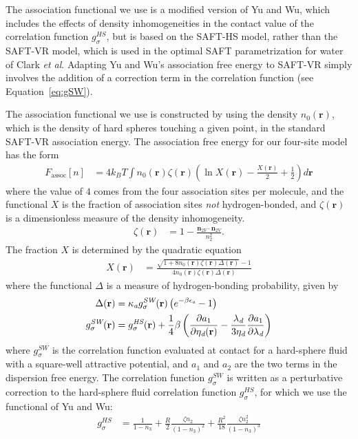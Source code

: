 \documentclass[letterpaper,twocolumn,amsmath,amssymb,prb]{revtex4-1}
\newcommand{\xx}{\textbf{r}}
\begin{document}
The association functional we use is a modified version of Yu
and Wu\cite{yu2002fmt-dft-inhomogeneous-associating}, which
includes the effects of density inhomogeneities in the contact value
of the correlation function $g^{HS}_\sigma$, but is based on the
SAFT-HS model, rather than the SAFT-VR
model\cite{gil-villegas-1997-SAFT-VR}, which is used in the optimal
SAFT parametrization for water of Clark \emph{et
  al}\cite{clark2006developing}.  Adapting Yu and Wu's association
free energy to SAFT-VR simply involves the addition of a correction
term in the correlation function (see Equation~\ref{eq:gSW}).

The association functional we use is constructed by using the density
$n_0(\xx)$, which is the density of hard spheres touching a given
point, in the standard SAFT-VR association
energy\cite{gil-villegas-1997-SAFT-VR}.
The association free energy for our four-site model has the form
\begin{align}
  F_\text{assoc}[n] &= 4 k_BT \int n_0(\xx) \zeta(\xx)
  \left(\ln X(\xx) - \frac{X(\xx)}{2} + \frac12\right) d\xx
\end{align}
where the value of $4$ comes from the four association sites per
molecule, and the functional $X$ is the fraction of association sites
\emph{not} hydrogen-bonded, and $\zeta(\xx)$ is a dimensionless
measure of the density inhomogeneity.
\begin{align}
  \zeta(\xx) &= 1 - \frac{\mathbf{n}_{2V}\cdot\mathbf{n}_{2V}}{n_2^2}.
\end{align}
%
The fraction $X$ is determined by the quadratic equation
\begin{align}
  X(\xx) &= \frac{\sqrt{1 + 8n_0(\xx)\zeta(\xx)
      \Delta(\xx)} - 1}
  {4 n_0(\xx)\zeta(\xx)
    \Delta(\xx)}
\end{align}
where the functional $\Delta$ is a measure of hydrogen-bonding
probability, given by
\begin{align}
  \Delta(\xx) &= \kappaassoc g^\textit{SW}_\sigma(\xx)
  \left(e^{-\beta\epsilonassoc} - 1\right) \\
  g^\textit{SW}_\sigma(\xx) &= g^\textit{HS}_\sigma(\xx) +
  \frac{1}{4}\beta\left(\frac{\partial a_1}{\partial \etadisp(\xx)} -
  \frac{\lambdadisp}{3 \etadisp}\frac{\partial a_1}{\partial \lambdadisp}\right)\label{eq:gSW}
\end{align}
where $g^\textit{SW}_\sigma$ is the correlation function evaluated at
contact for a hard-sphere fluid with a square-well attractive
potential, and $a_1$ and $a_2$ are the two terms in the dispersion
free energy.  The correlation function $g^\textit{SW}_\sigma$ is
written as a perturbative correction to the hard-sphere fluid
correlation function $g^\textit{HS}_\sigma$, for which we use the
functional of Yu and Wu\cite{yu2002fmt-dft-inhomogeneous-associating}:
\begin{align}
  g_\sigma^{HS} &= \frac{1}{1-n_3}
  +\frac{R}{2}\frac{\zeta n_2}{(1-n_3)^2}
  + \frac{R^2}{18}\frac{\zeta n_2^2}{(1-n_3)^3}
\end{align}
\end{document}

